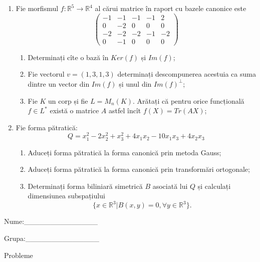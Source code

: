 \documentclass{article}
\begin{document}
\begin{enumerate}
 \item Fie morfismul $f:\mathbb{R}^5 \to \mathbb{R}^4$ al cărui matrice în raport cu bazele canonice este
$$\begin{pmatrix}
-1&-1&-1&-1&2\\
0&-2&0&0&0\\
-2&-2&-2&-1&-2\\
0&-1&0&0&0
\end{pmatrix}$$

\begin{enumerate}
\item Determinați cîte o bază în $Ker(f)$ și $Im(f)$;
\item Fie vectorul $v=(1,3,1,3)$ determinați descompunerea acestuia ca suma dintre un vector din $Im(f)$ și unul din $Im(f)^\perp$;
\item Fie $K$ un corp și fie $L=M_n(K)$. Arătați că pentru orice funcțională $f \in L^*$ există o matrice $A$ astfel încît $f(X)=Tr(AX)$;
\end{enumerate}
\item Fie forma pătratică:
$$Q= x_1^2-2x_2^2+x_3^2+4x_1x_2-10x_1x_3+4x_2x_3$$

\begin{enumerate}
\item Aduceți forma pătratică la forma canonică prin metoda Gauss;
\item Aduceți forma pătratică la forma canonică prin transformări ortogonale;
\item Determinați forma biliniară simetrică $B$ asociată lui $Q$ și calculați dimensiunea subspațiului
$$\{x \in \mathbb{R}^3 | B(x,y)=0,\forall y \in \mathbb{R}^3\}.$$

\end{enumerate}
\end{enumerate}
\newpage
\begin{flushright}
Nume:\_\_\_\_\_\_\_\_\_\_\_\_\_\_
 
 
Grupa:\_\_\_\_\_\_\_\_\_\_\_\_\_\_
\end{flushright}
\begin{center}
\vspace{2cm}
{\Large Probleme}
\vspace{2cm}
\end{center}
\end{document}
